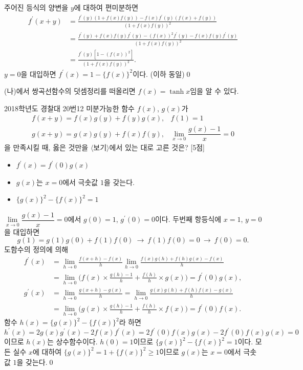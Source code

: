 \documentclass{article}
\begin{document}
\begin{sol}[편미분 풀이]
	주어진 등식의 양변을 $y$에 대하여 편미분하면
	\begin{align*}
		f^\prime(x+y)&=\frac{f^\prime(y)(1+f(x)f(y))-f(x)f^\prime(y)(f(x)+f(y))}{(1+f(x)f(y))^2}\\[3pt]
		&=\frac{f^\prime(y)+f(x)f(y)f^\prime(y)-(f(x))^2f^\prime(y)-f(x)f(y)f^\prime(y)}{(1+f(x)f(y))^2}\\[3pt]
		&=\frac{f^\prime(y)[1-(f(x))^2]}{(1+f(x)f(y))^2}.
	\end{align*}
	$y=0$을 대입하면 $f^\prime(x)=1-\{f(x)\}^2$이다. (이하 동일)\qed
\end{sol}

\begin{remark}
	(나)에서 쌍곡선함수의 덧셈정리를 떠올리면 $f(x)=\tanh x$임을 알 수 있다.
\end{remark}

\newpage
\begin{prob}{2018학년도 경찰대 20번}{12}
	미분가능한 함수 $f(x)$, $g(x)$가
	\[
		\begin{array}{ll}
			f(x+y)=f(x)g(y)+f(y)g(x), & f(1)=1 \\[3pt]
			g(x+y)=g(x)g(y)+f(x)f(y), & \lim\limits_{x\to0}\dfrac{g(x)-1}{x}=0
		\end{array}
	\]
	을 만족시킬 때, 옳은 것만을 $\langle$보기$\rangle$에서 있는 대로 고른 것은? [5점]
	\begin{hint}[보기]
		\begin{itemize}
			\item[ㄱ.] $f^\prime(x)=f^\prime(0)g(x)$
			\item[ㄴ.] $g(x)$는 $x=0$에서 극솟값 $1$을 갖는다.
			\item[ㄷ.] $\{g(x)\}^2-\{f(x)\}^2=1$
		\end{itemize}
	\end{hint}
\end{prob}

\begin{sol}[정석 풀이]
	$\lim\limits_{x\to0}\dfrac{g(x)-1}{x}=0$에서 $g(0)=1$, $g^\prime(0)=0$이다. 두번째 항등식에 $x=1$, $y=0$을 대입하면
	\[
		g(1)=g(1)g(0)+f(1)f(0)~\longrightarrow~f(1)f(0)=0~\longrightarrow~f(0)=0.
	\]
	도함수의 정의에 의해
	\begin{align*}
		f^\prime(x)&=\lim\limits_{h\to0}\frac{f(x+h)-f(x)}{h}\lim\limits_{h\to0}\frac{f(x)g(h)+f(h)g(x)-f(x)}{h}\\[3pt]
		&=\lim\limits_{h\to0}\biggl(f(x)\times\frac{g(h)-1}{h}+\frac{f(h)}{h}\times g(x)\biggr)=f^\prime(0)g(x),\\[3pt]
		g^\prime(x)&=\lim\limits_{h\to0}\frac{g(x+h)-g(x)}{h}=\lim\limits_{h\to0}\frac{g(x)g(h)+f(h)f(x)-g(x)}{h}\\[3pt]
		&=\lim\limits_{h\to0}\biggl(g(x)\times\frac{g(h)-1}{h}+\frac{f(h)}{h}\times f(x)\biggr)=f^\prime(0)f(x).
	\end{align*}
	함수 $h(x)=\{g(x)\}^2-\{f(x)\}^2$라 하면
	\[
		h^\prime(x)=2g(x)g^\prime(x)-2f(x)f^\prime(x)=2f^\prime(0)f(x)g(x)-2f^\prime(0)f(x)g(x)=0
	\]
	이므로 $h(x)$는 상수함수이다. $h(0)=1$이므로 $\{g(x)\}^2-\{f(x)\}^2=1$이다. 모든 실수 $x$에 대하여 $\{g(x)\}^2=1+\{f(x)\}^2\geq1$이므로 $g(x)$는 $x=0$에서 극솟값 $1$을 갖는다.\qed
\end{sol}
\end{document}
